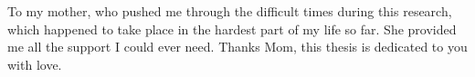 To my mother, who pushed me through the difficult times during this research,
which happened to take place in the hardest part of my life so far. She
provided me all the support I could ever need. Thanks Mom, this thesis is
dedicated to you with love.
